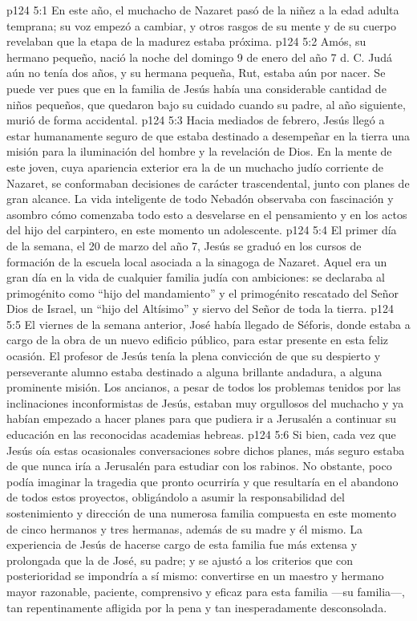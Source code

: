 \vs p124 5:1 En este año, el muchacho de Nazaret pasó de la niñez a la edad adulta temprana; su voz empezó a cambiar, y otros rasgos de su mente y de su cuerpo revelaban que la etapa de la madurez estaba próxima.
\vs p124 5:2 Amós, su hermano pequeño, nació la noche del domingo 9 de enero del año 7 d. C. Judá aún no tenía dos años, y su hermana pequeña, Rut, estaba aún por nacer. Se puede ver pues que en la familia de Jesús había una considerable cantidad de niños pequeños, que quedaron bajo su cuidado cuando su padre, al año siguiente, murió de forma accidental.
\vs p124 5:3 \pc Hacia mediados de febrero, Jesús llegó a estar humanamente seguro de que estaba destinado a desempeñar en la tierra una misión para la iluminación del hombre y la revelación de Dios. En la mente de este joven, cuya apariencia exterior era la de un muchacho judío corriente de Nazaret, se conformaban decisiones de carácter trascendental, junto con planes de gran alcance. La vida inteligente de todo Nebadón observaba con fascinación y asombro cómo comenzaba todo esto a desvelarse en el pensamiento y en los actos del hijo del carpintero, en este momento un adolescente.
\vs p124 5:4 \pc El primer día de la semana, el 20 de marzo del año 7, Jesús se graduó en los cursos de formación de la escuela local asociada a la sinagoga de Nazaret. Aquel era un gran día en la vida de cualquier familia judía con ambiciones: se declaraba al primogénito como “hijo del mandamiento” y el primogénito rescatado del Señor Dios de Israel, un “hijo del Altísimo” y siervo del Señor de toda la tierra.
\vs p124 5:5 El viernes de la semana anterior, José había llegado de Séforis, donde estaba a cargo de la obra de un nuevo edificio público, para estar presente en esta feliz ocasión. El profesor de Jesús tenía la plena convicción de que su despierto y perseverante alumno estaba destinado a alguna brillante andadura, a alguna prominente misión. Los ancianos, a pesar de todos los problemas tenidos por las inclinaciones inconformistas de Jesús, estaban muy orgullosos del muchacho y ya habían empezado a hacer planes para que pudiera ir a Jerusalén a continuar su educación en las reconocidas academias hebreas.
\vs p124 5:6 Si bien, cada vez que Jesús oía estas ocasionales conversaciones sobre dichos planes, más seguro estaba de que nunca iría a Jerusalén para estudiar con los rabinos. No obstante, poco podía imaginar la tragedia que pronto ocurriría y que resultaría en el abandono de todos estos proyectos, obligándolo a asumir la responsabilidad del sostenimiento y dirección de una numerosa familia compuesta en este momento de cinco hermanos y tres hermanas, además de su madre y él mismo. La experiencia de Jesús de hacerse cargo de esta familia fue más extensa y prolongada que la de José, su padre; y se ajustó a los criterios que con posterioridad se impondría a sí mismo: convertirse en un maestro y hermano mayor razonable, paciente, comprensivo y eficaz para esta familia ---su familia---, tan repentinamente afligida por la pena y tan inesperadamente desconsolada.
